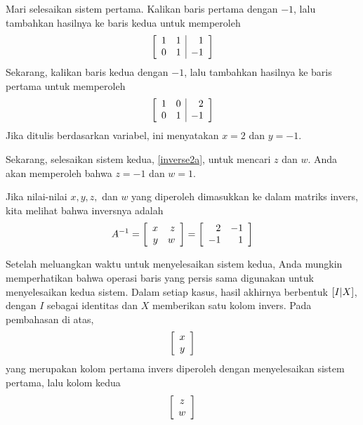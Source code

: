Mari selesaikan sistem pertama. Kalikan baris pertama dengan $-1$,
lalu tambahkan hasilnya ke baris kedua untuk memperoleh
\begin{equation*}
\left[
\begin{array}{rr|r}
1 & 1 & 1 \\
0 & 1 & -1
\end{array}
\right]
\end{equation*}
Sekarang, kalikan baris kedua dengan $-1$, lalu tambahkan hasilnya ke baris pertama untuk
memperoleh
\begin{equation*}
\left[
\begin{array}{rr|r}
1 & 0 & 2 \\
0 & 1 & -1
\end{array}
\right] 
\end{equation*}
Jika ditulis berdasarkan variabel, ini menyatakan $x=2$ dan $y=-1.$

Sekarang, selesaikan sistem kedua, \ref{inverse2a}, untuk mencari $z$ dan $w.$ Anda akan memperoleh bahwa
$z = -1$ dan $w = 1$.

Jika nilai-nilai $x,y,z,$ dan $w$ yang diperoleh
dimasukkan ke dalam matriks invers, kita melihat bahwa inversnya
adalah
\begin{equation*}
A^{-1} = 
\left[
\begin{array}{rr}
x & z \\
y & w
\end{array}
\right]
=
\left[
\begin{array}{rr}
2 & -1 \\
-1 & 1
\end{array}
\right] 
\end{equation*}

Setelah meluangkan waktu untuk menyelesaikan sistem kedua, Anda mungkin memperhatikan bahwa operasi baris yang persis sama
digunakan untuk menyelesaikan kedua sistem. Dalam setiap kasus, hasil akhirnya berbentuk
$\left[ I|X\right] $, dengan $I$ sebagai
identitas dan $X$ memberikan satu kolom invers. Pada pembahasan di atas,
\begin{equation*}
\left[
\begin{array}{c}
x \\
y
\end{array}
\right]
\end{equation*}
yang merupakan kolom pertama invers diperoleh dengan menyelesaikan sistem pertama, lalu
kolom kedua
\begin{equation*}
\left[
\begin{array}{c}
z \\
w
\end{array}
\right] 
\end{equation*}

